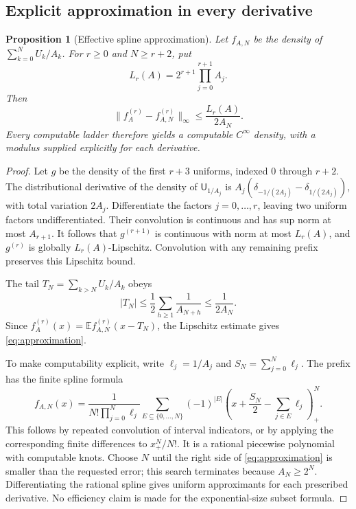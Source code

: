 \documentclass[11pt,a4paper]{article}
\newtheorem{proposition}[theorem]{Proposition}
\theoremstyle{definition}
\theoremstyle{remark}
\newcommand{\E}{\mathbb E}
\newcommand{\Unif}{\mathsf U}
\begin{document}
\subsection{Explicit approximation in every derivative}
\begin{proposition}[Effective spline approximation]\label{prop:approximation}
Let $f_{A,N}$ be the density of $\sum_{k=0}^NU_k/A_k$. For $r\ge0$ and
$N\ge r+2$, put
\[
 L_r(A)=2^{r+1}\prod_{j=0}^{r+1}A_j.
\]
Then
\begin{equation}\label{eq:approximation}
 \|f_A^{(r)}-f_{A,N}^{(r)}\|_\infty
 \le \frac{L_r(A)}{2A_N}.
\end{equation}
Every computable ladder therefore yields a computable $C^\infty$ density,
with a modulus supplied explicitly for each derivative.
\end{proposition}
\begin{proof}
Let $g$ be the density of the first $r+3$ uniforms, indexed $0$ through
$r+2$. The distributional derivative of the density of $\Unif_{1/A_j}$
is $A_j(\delta_{-1/(2A_j)}-\delta_{1/(2A_j)})$, with total variation
$2A_j$. Differentiate the factors $j=0,\ldots,r$, leaving two uniform
factors undifferentiated. Their convolution is continuous and has sup norm
at most $A_{r+1}$. It follows that $g^{(r+1)}$ is continuous with norm at
most $L_r(A)$, and $g^{(r)}$ is globally $L_r(A)$-Lipschitz.
Convolution with any remaining prefix preserves this Lipschitz bound.

The tail $T_N=\sum_{k>N}U_k/A_k$ obeys
\[
 |T_N|\le\frac12\sum_{h\ge1}\frac1{A_{N+h}}
 \le\frac1{2A_N}.
\]
Since $f_A^{(r)}(x)=\E f_{A,N}^{(r)}(x-T_N)$, the Lipschitz estimate gives
\eqref{eq:approximation}.

To make computability explicit, write $\ell_j=1/A_j$ and
$S_N=\sum_{j=0}^N\ell_j$. The prefix has the finite spline formula
\begin{equation}\label{eq:box-spline}
 f_{A,N}(x)=\frac1{N!\prod_{j=0}^N\ell_j}
 \sum_{E\subseteq\{0,\ldots,N\}}(-1)^{|E|}
 \left(x+\frac{S_N}{2}-\sum_{j\in E}\ell_j\right)_+^{N}.
\end{equation}
This follows by repeated convolution of interval indicators, or by applying
the corresponding finite differences to $x_+^N/N!$. It is a rational
piecewise polynomial with computable knots. Choose $N$ until the right side
of \eqref{eq:approximation} is smaller than the requested error; this search
terminates because $A_N\ge2^N$. Differentiating the rational spline gives
uniform approximants for each prescribed derivative. No efficiency claim
is made for the exponential-size subset formula.
\end{proof}
\end{document}
